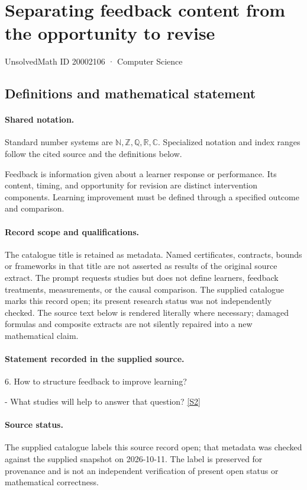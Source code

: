 \documentclass[11pt]{article}
\newcommand{\sref}[2]{\hyperlink{source:#1:#2}{[S#2]}}
\begin{document}
\setcounter{section}{20002105}
\section{Separating feedback content from the opportunity to revise}\label{20002106}
{\small\sffamily UnsolvedMath ID 20002106 · Computer Science}
\subsection{Definitions and mathematical statement}

\paragraph{Shared notation.}Standard number systems are $\mathbb N,\mathbb Z,\mathbb Q,\mathbb R,\mathbb C$. Specialized notation and index ranges follow the cited source and the definitions below.


Feedback is information given about a learner response or performance. Its content, timing, and opportunity for revision are distinct intervention components. Learning improvement must be defined through a specified outcome and comparison.
\paragraph{Record scope and qualifications.}
The catalogue title is retained as metadata. Named certificates, contracts, bounds or frameworks in that title are not asserted as results of the original source extract.
The prompt requests studies but does not define learners, feedback treatments, measurements, or the causal comparison. The supplied catalogue marks this record open; its present research status was not independently checked.
The source text below is rendered literally where necessary; damaged formulas and composite extracts are not silently repaired into a new mathematical claim.
\paragraph{Statement recorded in the supplied source.}
6. How to structure feedback to improve learning?

- What studies will help to answer that question? \sref{20002106}{2}
\paragraph{Source status.}
The supplied catalogue labels this source record open; that metadata was checked against the supplied snapshot on 2026-10-11. The label is preserved for provenance and is not an independent verification of present open status or mathematical correctness.
\end{document}
